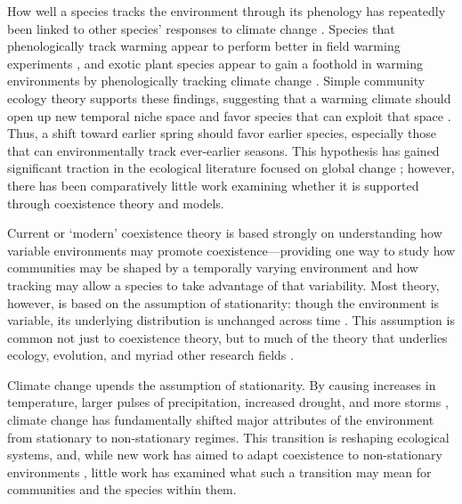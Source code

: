 \documentclass[11pt,letterpaper]{article}
\begin{document}
How well a species tracks the environment through its phenology has repeatedly been linked to other species' responses to climate change \citep{Cleland:2012,ramula2015}. Species that phenologically track warming appear to perform better in field warming experiments \citep{Cleland:2012}, and exotic plant species appear to gain a foothold in warming environments by phenologically tracking climate change \citep{Willis:2010al}. Simple community ecology theory supports these findings, suggesting that a warming climate should open up new temporal niche space and favor species that can exploit that space \citep{gotelli1996,wolkovich:2010fee,Zettlemoyer2019}. Thus, a shift toward earlier spring should favor earlier species, especially those that can environmentally track ever-earlier seasons. This hypothesis has gained significant traction in the ecological literature focused on global change \citep[e.g.,][]{Cleland:2012}; however, there has been comparatively little work examining whether it is supported through coexistence theory and models. 

Current or `modern' coexistence theory is based strongly on understanding how variable environments may promote coexistence---providing one way to study how communities may be shaped by a temporally varying environment and how tracking may allow a species to take advantage of that variability. Most theory, however, is based on the assumption of stationarity: though the environment is variable, its underlying distribution is unchanged across time \citep{barabas2018}. This assumption is common not just to coexistence theory, but to much of the theory that underlies ecology, evolution, and myriad other research fields \citep[e.g.,][]{Milly:2008yu,nosenko2013}. 

Climate change upends the assumption of stationarity. By causing increases in temperature, larger pulses of precipitation, increased drought, and more storms \citep{ipcc2013}, climate change has fundamentally shifted major attributes of the environment from stationary to non-stationary regimes. This transition is reshaping ecological systems, and, while new work has aimed to adapt coexistence to non-stationary environments \citep{chessonnonstat}, little work has examined what such a transition may mean for communities and the species within them.  %
\end{document}
